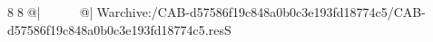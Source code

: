 8  8  @|                                                   @| W   archive:/CAB-d57586f19c848a0b0c3e193fd18774c5/CAB-d57586f19c848a0b0c3e193fd18774c5.resS 